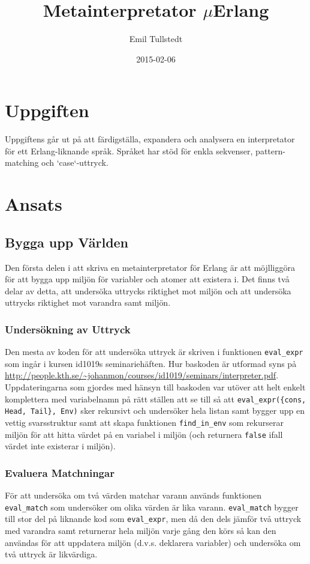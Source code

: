 \documentclass[a4paper, 11pt]{article}
\title{Metainterpretator $\mu$Erlang}
\author{Emil Tullstedt}
\date{2015-02-06}
\begin{document}
\maketitle

\section{Uppgiften}

Uppgiftens går ut på att färdigställa, expandera och analysera en interpretator för ett Erlang-liknande språk. Språket har stöd för enkla sekvenser, pattern-matching och `case`-uttryck.

\section{Ansats}

\subsection{Bygga upp Världen}
Den första delen i att skriva en metainterpretator för Erlang är att möjlliggöra för att bygga upp miljön för variabler och atomer att existera i. Det finns två delar av detta, att under\-söka uttrycks riktighet mot miljön och att und\-er\-söka uttrycks riktighet mot varandra samt miljön.

\subsubsection{Undersökning av Uttryck}
Den mesta av koden för att undersöka uttryck är skriven i funktionen \texttt{eval_expr} som ingår i kursen id1019s seminariehäften. Hur baskoden är utformad syns på \url{http://people.kth.se/~johanmon/courses/id1019/seminars/interpreter.pdf}. Uppdateringarna som gjordes med hänsyn till baskoden var utöver att helt enkelt komplettera med variabelnamn på rätt ställen att se till så att \lstinline$eval_expr({cons, Head, Tail}, Env)$ sker rekursivt och undersöker hela listan samt bygger upp en vettig svarsstruktur samt att skapa funktionen \texttt{find_in_env} som rekurserar miljön för att hitta värdet på en variabel i miljön (och returnera \texttt{false} ifall värdet inte existerar i miljön).

\subsubsection{Evaluera Matchningar}
För att undersöka om två värden matchar varann används funktionen \texttt{eval_match} som undersöker om olika värden är lika varann. \texttt{eval_match} bygger till stor del på liknande kod som \texttt{eval_expr}, men då den dels jämför två uttryck med varandra samt returnerar hela miljön varje gång den körs så kan den användas för att uppdatera miljön (d.v.s. deklarera variabler) och undersöka om två uttryck är likvärdiga.
\end{document}
